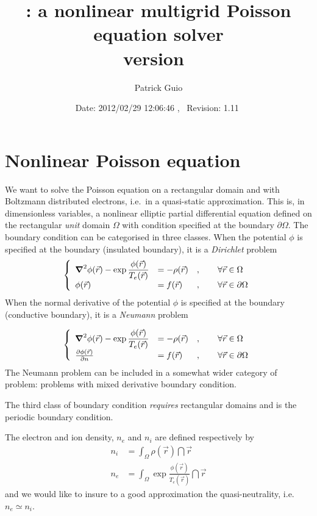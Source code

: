 \documentclass[10pt,a4paper]{article}
\title{\mudfas: a nonlinear multigrid Poisson equation
solver\\version~\version}
\author{Patrick Guio}
\date{\normalsize$ $Date: 2012/02/29 12:06:46 $ $,~ $ $Revision: 1.11 $ $}
\begin{document}
\maketitle

\tableofcontents

\section{Nonlinear Poisson equation}
We want to solve the Poisson equation on a rectangular domain and with
Boltzmann distributed electrons, i.e.\ in a quasi-static approximation.
This is, in dimensionless variables, a nonlinear elliptic partial
differential equation defined on the rectangular \emph{unit} domain $\Omega$
with condition specified at the boundary $\partial\Omega$. The boundary
condition can be categorised  in three classes. When the potential $\phi$ is
specified at the boundary (insulated boundary), it is a \emph{Dirichlet}
problem
\begin{align}
\left\{\begin{array}{lll}\displaystyle
\grad^2\phi(\vec{r})-\exp\frac{\phi(\vec{r})}{T_e(\vec{r})}&=
-\rho(\vec{r})&,\qquad\forall\vec{r}\in\Omega\\
\phi(\vec{r})&=f(\vec{r})&,\qquad\forall\vec{r}\in\partial\Omega
\end{array}\right.
\label{eq:dirichlet} 
\end{align} 
When the normal derivative of the potential $\phi$ is  specified at the
boundary (conductive boundary), it is a \emph{Neumann} problem

\begin{align}
\left\{\begin{array}{lll}\displaystyle
\grad^2\phi(\vec{r})-\exp\frac{\phi(\vec{r})}{T_e(\vec{r})}&=
-\rho(\vec{r})&,\qquad\forall\vec{r}\in\Omega\\
\frac{\partial\phi(\vec{r})}{\partial{n}}&=f(\vec{r})&,
\qquad\forall\vec{r}\in\partial\Omega 
\end{array}\right.
\label{eq:neumann} 
\end{align}
The Neumann problem can be included in a somewhat wider category
of problem: problems with mixed derivative boundary condition.

The third class of boundary condition \emph{requires} rectangular domains and 
is the periodic boundary condition.

The electron and ion density, $n_e$ and  $n_i$ are defined respectively 
by
\begin{align}
n_i&=\int_\Omega\rho(\vec{r})\dint{\vec{r}}\\
n_e&=\int_\Omega\exp\frac{\phi(\vec{r})}{T_e(\vec{r})}\dint{\vec{r}}
\end{align}
and we would like to insure to a good approximation the quasi-neutrality, i.e.\
$n_e\simeq n_i$.
\end{document}
